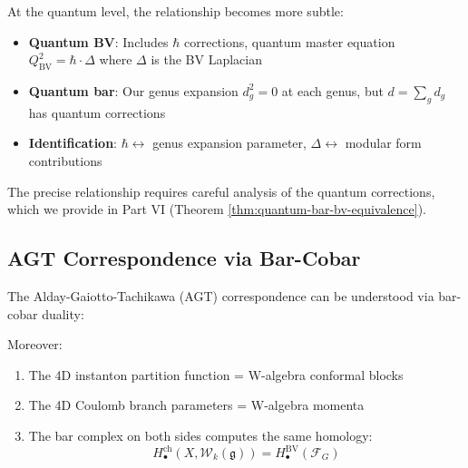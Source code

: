 \begin{remark}\label{rem:quantum-bv-bar}
At the quantum level, the relationship becomes more subtle:

\begin{itemize}
\item \textbf{Quantum BV}: Includes $\hbar$ corrections, quantum master equation 
      $Q_{\text{BV}}^2 = \hbar \cdot \Delta$ where $\Delta$ is the BV Laplacian
      
\item \textbf{Quantum bar}: Our genus expansion $d_g^2 = 0$ at each genus, but 
      $d = \sum_g d_g$ has quantum corrections
      
\item \textbf{Identification}: $\hbar \leftrightarrow$ genus expansion parameter, 
      $\Delta \leftrightarrow$ modular form contributions
\end{itemize}

The precise relationship requires careful analysis of the quantum corrections, 
which we provide in Part VI (Theorem \ref{thm:quantum-bar-bv-equivalence}).
\end{remark}

\subsection{AGT Correspondence via Bar-Cobar}

\begin{theorem}\label{thm:agt-bar-cobar}
The Alday-Gaiotto-Tachikawa (AGT) correspondence \cite{AGT09} can be understood 
via bar-cobar duality:

\begin{center}
\end{center}

Moreover:
\begin{enumerate}
\item The 4D instanton partition function = W-algebra conformal blocks
\item The 4D Coulomb branch parameters = W-algebra momenta
\item The bar complex on both sides computes the same homology:
      $$H_\bullet^{\text{ch}}(X, \mathcal{W}_k(\mathfrak{g})) = H_\bullet^{\text{BV}}(\mathcal{F}_G)$$
\end{enumerate}
\end{theorem}

